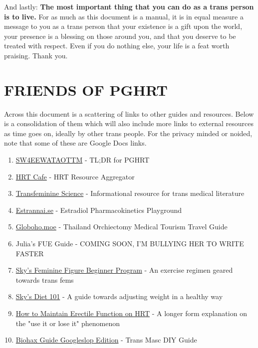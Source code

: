 \documentclass{article}
\begin{document}
And lastly: \textbf{The most important thing that you can do as a trans person is to live.} For as much as this document is a manual, it is in equal measure a message to you as a trans person that your existence is a gift upon the world, your presence is a blessing on those around you, and that you deserve to be treated with respect. Even if you do nothing else, your life is a feat worth praising. Thank you.



\section*{FRIENDS OF PGHRT}\label{FOPGHRT}

Across this document is a scattering of links to other guides and resources. Below is a consolidation of them which will also include more links to external resources as time goes on, ideally by other trans people. For the privacy minded or noided, note that some of these are Google Docs links.

\begin{enumerate}
  \item \href{https://startwith4mgestradiolenanthateweeklyandtestatonetothreemonths.com/}{SW4EEWATAOTTM} - TL;DR for PGHRT
  \item \href{https://hrtcafe.net/}{HRT Cafe} - HRT Resource Aggregator
  \item \href{https://transfemscience.org/}{Transfeminine Science} - Informational resource for trans medical literature
  \item \href{http://estrannai.se}{Estrannai.se} - Estradiol Pharmacokinetics Playground
  \item \href{https://globoho.moe/}{Globoho.moe} - Thailand Orchiectomy Medical Tourism Travel Guide
  \item Julia's FUE Guide - COMING SOON, I'M BULLYING HER TO WRITE FASTER
  \item \href{https://docs.google.com/document/d/1-NyE5EY5TTaRRMhk7HlTbKJ7HifjEsA4jlDO1qKQVl0/edit?tab=t.0}{Sky's Feminine Figure Beginner Program} - An exercise regimen geared towards trans fems
  \item \href{https://docs.google.com/document/d/114sztSw1aVWM2pXLDl9NrHklyvewz3EmFiHiisjM71k/edit?tab=t.0}{Sky's Diet 101} - A guide towards adjusting weight in a healthy way
  \item \href{https://stainedglasswoman.substack.com/p/how-to-maintain-your-penis-function}{How to Maintain Erectile Function on HRT} - A longer form explanation on the "use it or lose it" phenomenon
  \item \href{https://docs.google.com/document/d/1DXFxzN0XTudPZez_SO61fpqncRLPH_Be_QG_8Pcz9LU/edit?pli=1&tab=t.0}{Biohax Guide Googleslop Edition} - Trans Masc DIY Guide
\end{enumerate}
\end{document}
